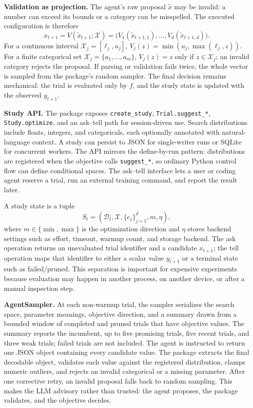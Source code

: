 \documentclass[letterpaper]{article}
\begin{document}
\textbf{Validation as projection.} The agent's raw proposal $\tilde{x}$ may be
invalid: a number can exceed its bounds or a category can be misspelled. The
executed configuration is therefore
\begin{equation}
  x_{t+1}=V(\tilde{x}_{t+1};\mathcal{X}) =
  \big(V_1(\tilde{x}_{t+1,1}),\ldots,V_d(\tilde{x}_{t+1,d})\big).
\end{equation}
For a continuous interval $\mathcal{X}_j=[\ell_j,u_j]$,
$V_j(z)=\min(u_j,\max(\ell_j,z))$. For a finite categorical set
$\mathcal{X}_j=\{a_1,\ldots,a_m\}$, $V_j(z)=z$ only if
$z\in\mathcal{X}_j$; an invalid category rejects the proposal. If parsing or
validation fails twice, the whole vector is sampled from the package's random
sampler. The final decision remains mechanical: the trial is evaluated only by
$f$, and the study state is updated with the observed $y_{t+1}$.

\textbf{Study API.} The package exposes \texttt{create\_study},
\texttt{Trial.suggest\_*}, \texttt{Study.optimize}, and an ask--tell path for
session-driven use. Search distributions include floats, integers, and
categoricals, each optionally annotated with natural-language context. A study
can persist to JSON for single-writer runs or SQLite for concurrent workers.
The API mirrors the define-by-run pattern: distributions are registered when
the objective calls \texttt{suggest\_*}, so ordinary Python control flow can
define conditional spaces. The ask--tell interface lets a user or coding agent
reserve a trial, run an external training command, and report the result later.

A study state is a tuple
\begin{equation}
  S_t=(\mathcal{D}_t,\mathcal{X},\{c_j\}_{j=1}^{d},m,\eta),
\end{equation}
where $m\in\{\min,\max\}$ is the optimization direction and $\eta$ stores
backend settings such as effort, timeout, warmup count, and storage backend.
The ask operation returns an unevaluated trial identifier and a candidate
$x_{t+1}$; the tell operation maps that identifier to either a scalar value
$y_{t+1}$ or a terminal state such as failed/pruned. This separation is
important for expensive experiments because evaluation may happen in another
process, on another device, or after a manual inspection step.

\textbf{AgentSampler.} At each non-warmup trial, the sampler serializes the
search space, parameter meanings, objective direction, and a summary drawn from
a bounded window of completed and pruned trials that have objective values. The
summary reports the incumbent, up to five promising trials, five recent trials,
and three weak trials; failed trials are not included. The agent is instructed
to return one JSON object containing every candidate value. The package extracts
the final decodable object, validates each value against the registered
distribution, clamps numeric outliers, and rejects an invalid categorical or a
missing parameter. After one corrective retry, an invalid proposal falls back
to random sampling. This makes the LLM advisory rather than trusted: the agent
proposes, the package validates, and the objective decides.
\end{document}
